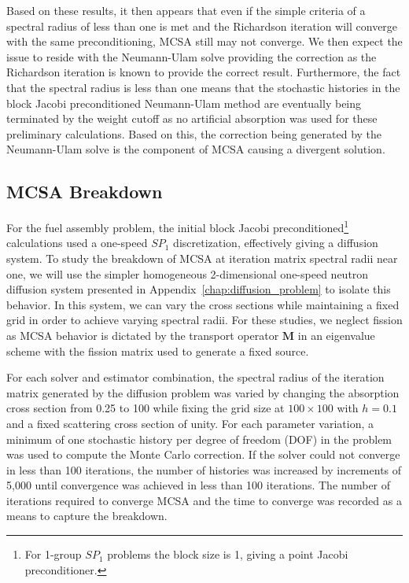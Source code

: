 Based on these results, it then appears that even if the simple
criteria of a spectral radius of less than one is met and the
Richardson iteration will converge with the same preconditioning, MCSA
still may not converge. We then expect the issue to reside with the
Neumann-Ulam solve providing the correction as the Richardson
iteration is known to provide the correct result. Furthermore, the
fact that the spectral radius is less than one means that the
stochastic histories in the block Jacobi preconditioned Neumann-Ulam
method are eventually being terminated by the weight cutoff as no
artificial absorption was used for these preliminary
calculations. Based on this, the correction being generated by the
Neumann-Ulam solve is the component of MCSA causing a divergent
solution.

\subsection{MCSA Breakdown}
\label{subsec:mcsa_break_down}
For the fuel assembly problem, the initial block Jacobi
preconditioned\footnote{For 1-group $SP_1$ problems the block size is
  1, giving a point Jacobi preconditioner.}  calculations used a
one-speed $SP_1$ discretization, effectively giving a diffusion
system. To study the breakdown of MCSA at iteration matrix spectral
radii near one, we will use the simpler homogeneous 2-dimensional
one-speed neutron diffusion system presented in
Appendix~\ref{chap:diffusion_problem} to isolate this behavior. In
this system, we can vary the cross sections while maintaining a fixed
grid in order to achieve varying spectral radii. For these studies, we
neglect fission as MCSA behavior is dictated by the transport operator
$\mathbf{M}$ in an eigenvalue scheme with the fission matrix used to
generate a fixed source.

For each solver and estimator combination, the spectral radius of the
iteration matrix generated by the diffusion problem was varied by
changing the absorption cross section from 0.25 to 100 while fixing
the grid size at $100 \times 100$ with $h = 0.1$ and a fixed
scattering cross section of unity. For each parameter variation, a
minimum of one stochastic history per degree of freedom (DOF) in the
problem was used to compute the Monte Carlo correction. If the solver
could not converge in less than 100 iterations, the number of
histories was increased by increments of 5,000 until convergence was
achieved in less than 100 iterations. The number of iterations
required to converge MCSA and the time to converge was recorded as a
means to capture the breakdown.

